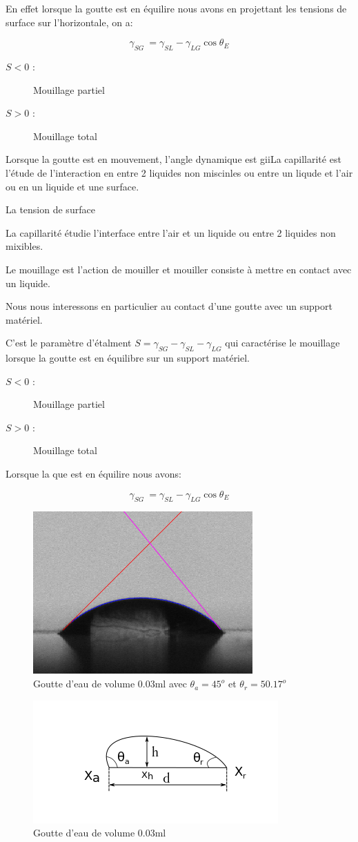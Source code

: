 \documentclass[french]{article}
\begin{document}
En effet lorsque la goutte est en équilire nous avons en projettant les tensions de surface sur l'horizontale, on a:

\begin{equation}
	\gamma_{SG}\ = \gamma_{SL} - \gamma_{LG}\cos\theta_{E}
\end{equation}
\begin{description}
\item[$S < 0$ :] Mouillage partiel
\item[$S > 0$ :] Mouillage total
\end{description}


Lorsque la goutte est en mouvement, l'angle dynamique  est giiLa capillarité est l'étude de l'interaction en entre 2 liquides non miscinles ou entre un liqude et l'air ou en un liquide et une surface.

La tension de surface 

La capillarité étudie l'interface entre l'air et un liquide ou entre 2 liquides
non mixibles.

Le mouillage est l'action de mouiller et mouiller consiste à mettre en contact avec un liquide.

Nous nous interessons en particulier au contact d'une goutte avec un support matériel.

C'est le paramètre d'étalment $S = \gamma_{SG} - \gamma_{SL} - \gamma_{LG}$ qui caractérise le mouillage lorsque la goutte est en équilibre sur un support matériel.

\begin{description}
\item[$S < 0$ :] Mouillage partiel
\item[$S > 0$ :] Mouillage total
\end{description}

Lorsque la que est en équilire nous avons:

\[\gamma_{SG}\ = \gamma_{SL} - \gamma_{LG}\cos\theta_{E} \]

\begin{figure}[ht]
	\centering
	\includegraphics[scale = 0.6]{./image/crop_tvitesse=28_volume=003.png}
	\caption{Goutte d'eau de volume $0.03$ml avec $\theta_{a} = 45^{o}$ et $\theta_{r} = 50.17^{o}$}
\end{figure}

\begin{figure}[ht]
	\centering
	\includegraphics[scale = 0.6]{./image/rrgou.png}
	\caption{Goutte d'eau de volume $0.03$ml}
\end{figure}
\end{document}
